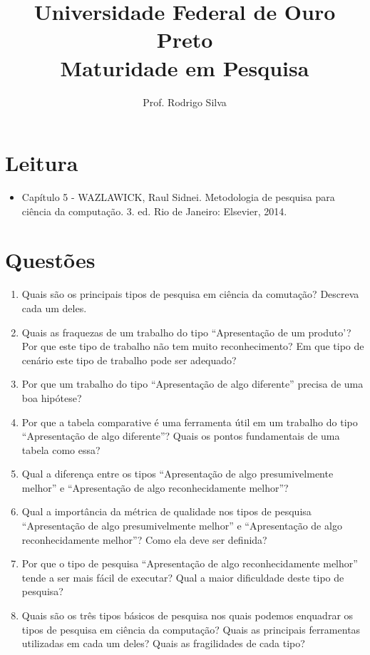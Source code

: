 \documentclass{article}
\title{\vspace{-2 cm}Universidade Federal de Ouro Preto \\ Maturidade em Pesquisa}
\author{Prof. Rodrigo Silva}
\date{}
\begin{document}
\maketitle

\section{Leitura}

\begin{itemize}
    \item Capítulo 5 - WAZLAWICK, Raul Sidnei. Metodologia de pesquisa para ciência da computação. 3. ed. Rio de Janeiro: Elsevier, 2014.
\end{itemize}

\section{Questões}

\begin{enumerate}
\item Quais são os principais tipos de pesquisa em ciência da comutação? Descreva cada um deles.
\item Quais as fraquezas de um trabalho do tipo ``Apresentação de um produto'? Por que este tipo de trabalho não tem  muito reconhecimento? Em que tipo de cenário este tipo de trabalho pode ser adequado?
\item Por que um trabalho do tipo ``Apresentação de algo diferente'' precisa de uma boa hipótese? 
\item Por que a tabela comparative é uma ferramenta útil em um trabalho do tipo ``Apresentação de algo diferente''? Quais os pontos fundamentais de uma tabela como essa?
\item Qual a diferença entre os tipos ``Apresentação de algo presumivelmente melhor'' e ``Apresentação de algo reconhecidamente melhor''?
\item Qual a importância da métrica de qualidade nos tipos de pesquisa ``Apresentação de algo presumivelmente melhor'' e ``Apresentação de algo reconhecidamente melhor''? Como ela deve ser definida?
\item Por que o tipo de pesquisa ``Apresentação de algo reconhecidamente melhor'' tende a ser mais fácil de executar? Qual a maior dificuldade deste tipo de pesquisa?
\item Quais são os três tipos básicos de pesquisa nos quais podemos enquadrar os tipos de pesquisa em ciência da computação? Quais as principais ferramentas utilizadas em cada um deles? Quais as fragilidades de cada tipo?

\end{enumerate}


%
%
\end{document}
